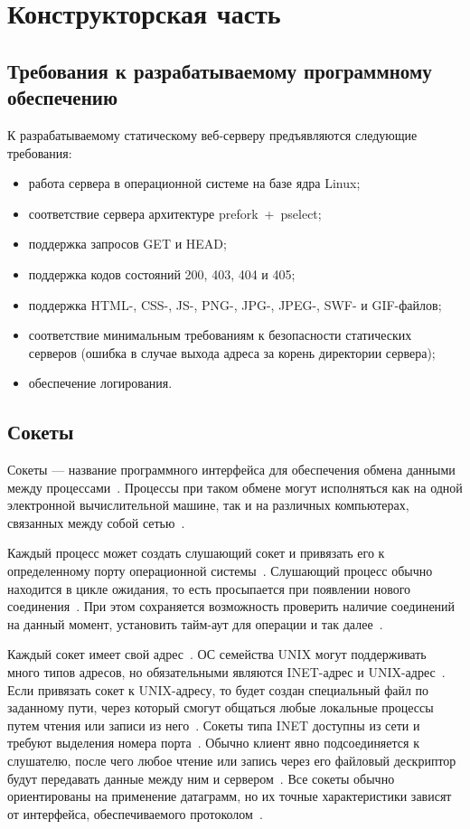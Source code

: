\chapter{Конструкторская часть}

\section{Требования к разрабатываемому программному обеспечению}

К разрабатываемому статическому веб-серверу предъявляются следующие требования:
\begin{itemize}
	\item работа сервера в операционной системе на базе ядра Linux;
	\item соответствие сервера архитектуре prefork~+~pselect;
	\item поддержка запросов GET и HEAD;
	\item поддержка кодов состояний 200, 403, 404 и 405;
	\item поддержка HTML-, CSS-, JS-, PNG-, JPG-, JPEG-, SWF- и GIF-файлов;
	\item соответствие минимальным требованиям к безопасности статических серверов (ошибка в случае выхода адреса за корень директории сервера);
	\item обеспечение логирования.
\end{itemize}

\section{Сокеты}

Сокеты — название программного интерфейса для обеспечения обмена данными между процессами~\cite{socket}. Процессы при таком обмене могут исполняться как на одной электронной вычислительной машине, так и на различных компьютерах, связанных между собой сетью~\cite{socket}.

Каждый процесс может создать слушающий сокет и привязать его к определенному порту операционной системы~\cite{socket}.
Слушающий процесс обычно находится в цикле ожидания, то есть просыпается при появлении нового соединения~\cite{socket}.
При этом сохраняется возможность проверить наличие соединений на данный момент, установить тайм-аут для операции и так далее~\cite{socket}.

Каждый сокет имеет свой адрес~\cite{socket}.
ОС семейства UNIX могут поддерживать много типов адресов, но обязательными являются INET-адрес и UNIX-адрес~\cite{socket}.
Если привязать сокет к UNIX-адресу, то будет создан специальный файл по заданному пути, через который смогут общаться любые локальные процессы путем чтения или записи из него~\cite{socket}.
Сокеты типа INET доступны из сети и требуют выделения номера порта~\cite{socket}.
Обычно клиент явно подсоединяется к слушателю, после чего любое чтение или запись через его файловый дескриптор будут передавать данные между ним и сервером~\cite{socket}.
Все сокеты обычно ориентированы на применение датаграмм, но их точные характеристики зависят от интерфейса, обеспечиваемого протоколом~\cite{socket}.

